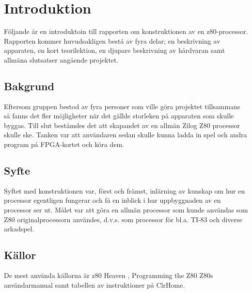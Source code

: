 \documentclass[main.tex]{subfiles}
\begin{document}
\section{Introduktion}
Följande är en introduktoin till rapporten om konstruktionen av en
z80-processor. Rapporten kommer huvudsakligen bestå av fyra delar; en
beskrivning av apparaten, en kort teorilektion, en djupare beskrivning av
hårdvaran samt allmäna slutsatser angående projektet.
\subsection{Bakgrund}
Eftersom gruppen bestod av fyra personer som ville göra projektet tillsammans
så fanns det fler möjligheter när det gällde storleken på apparaten som skulle
byggas. Till slut bestämdes det att skapandet av en allmän Zilog Z80 processor
skulle ske. Tanken var att användaren sedan skulle kunna ladda in spel och
andra program på FPGA-kortet och köra dem.
\subsection{Syfte}
Syftet med konstruktionen var, först och främst, inlärning av kunskap om hur en
processor egentligen fungerar och få en inblick i hur uppbyggnaden av en
processor ser ut. Målet var att göra en allmän processor som kunde användas som
Z80 originalprocessorn användes, d.v.s. som processor för bl.a. TI-83 och
diverse arkadspel.
\subsection{Källor}
De mest använda källorna är z80 Heaven \cite{z80heaven}, Programming the Z80
\cite{programmingthez80} Z80s användarmanual \cite{userman} samt tabellen av
instruktioner på ClrHome. \cite{ClrHome}
\clearpage
\end{document}
